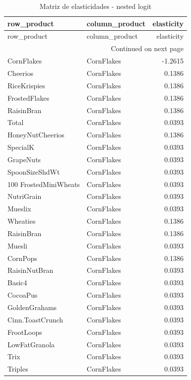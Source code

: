 \scriptsize
\begin{longtable}{llr}
\caption{Matriz de elasticidades - nested logit}\label{tab:elas-nested}\\
\toprule
row_product & column_product & elasticity \\
\midrule
\endfirsthead
\toprule
row_product & column_product & elasticity \\
\midrule
\endhead
\midrule
\multicolumn{3}{r}{Continued on next page} \\
\midrule
\endfoot
\bottomrule
\endlastfoot
CornFlakes & CornFlakes & -1.2615 \\
Cheerios & CornFlakes & 0.1386 \\
RiceKrispies & CornFlakes & 0.1386 \\
FrostedFlakes & CornFlakes & 0.1386 \\
RaisinBran & CornFlakes & 0.1386 \\
Total & CornFlakes & 0.0393 \\
HoneyNutCheerios & CornFlakes & 0.1386 \\
SpecialK & CornFlakes & 0.0393 \\
GrapeNuts & CornFlakes & 0.0393 \\
SpoonSizeShdWt & CornFlakes & 0.0393 \\
100%
FrostedMiniWheats & CornFlakes & 0.0393 \\
NutriGrain & CornFlakes & 0.0393 \\
Mueslix & CornFlakes & 0.0393 \\
Wheaties & CornFlakes & 0.1386 \\
RaisinBran & CornFlakes & 0.1386 \\
Muesli & CornFlakes & 0.0393 \\
CornPops & CornFlakes & 0.1386 \\
RaisinNutBran & CornFlakes & 0.0393 \\
Basic4 & CornFlakes & 0.0393 \\
CocoaPus & CornFlakes & 0.0393 \\
GoldenGrahams & CornFlakes & 0.0393 \\
Cinn.ToastCrunch & CornFlakes & 0.0393 \\
FrootLoops & CornFlakes & 0.0393 \\
LowFatGranola & CornFlakes & 0.0393 \\
Trix & CornFlakes & 0.0393 \\
Triples & CornFlakes & 0.0393 \\

\end{longtable}
